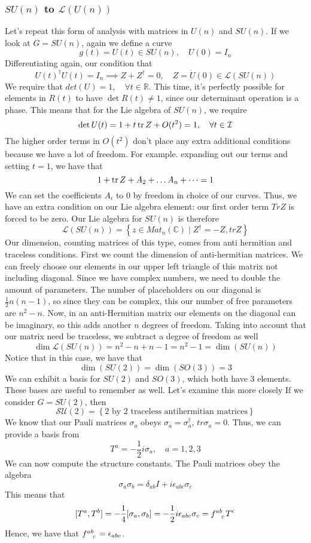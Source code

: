 \documentclass[11pt, oneside]{article}   	%
\theoremstyle{slanted}
\begin{document}
\subsubsection{ $ SU ( n ) $ to $ \mathcal{ L } ( U ( n ) ) $}
Let's repeat this form of analysis with matrices in 
$ U ( n ) $ and $ SU ( n ) $. 
If we look at $ G = SU ( n ) $, 
again we define a curve 
\[
g ( t) = U ( t) \in SU ( n ), \quad U ( 0 ) = I_n  
\] Differentiating again, our condition that 
\[
 U ( t)^\dagger U ( t )  = I_n \implies Z + Z^\dagger = 0, \quad Z = \dot{ U } ( 0 ) \in \mathcal{ L }( SU ( n ) ) 
\] We require that $ det ( U ) = 1 , \quad \forall t \in \mathbb{ R} $. 
This time, it's perfectly possible for elements in 
$ R (t)$ to have  $ \det  R( t) \neq 1 $, since 
our determinant operation is a phase. 
This means that for the Lie algebra of $ SU ( n ) $, 
we require 
\[
 \det U ( t) = 1 + t \tr Z   + O ( t^2)  = 1, \quad  \forall t \in \mathcal{ I  }
\] 
The higher order terms in $ O ( t^2 ) $ don't place 
any extra additional conditions because we have a lot of freedom. For example. 
expanding out our terms and setting $ t = 1 $, we have
that 
 \[
 1 + \tr Z  + A_2 + \dots A_n + \dots = 1
\] We can set the coefficients $ A_i $ to 0 
by freedom in choice of our curves. Thus, 
we have an extra condition on our Lie algebra element:
our first order term $ Tr Z $ is forced to be zero. 
Our Lie algebra for $ SU ( n ) $ is therefore 
\[
 \mathcal{ L }( SU ( n ) ) = \left\{  z \in Mat_n ( \mathbb{ C} ) \mid Z^\dagger  = - Z, tr Z  \right\} 
\] Our dimension, counting matrices of this type, comes from anti hermitian and traceless conditions.
First we count the dimension of 
anti-hermitian matrices. We can freely 
choose our elements in our upper left triangle 
of this matrix not including diagonal. Since we have complex numbers, 
we need to double the amount of parameters. The number 
of placeholders on our diagonal is $\frac{1}{2 } n ( n - 1) $, 
so since they can be complex, this our number of 
free parameters are $ n ^ 2 - n $. Now, in an anti-Hermitian matrix 
our elements on the diagonal can be imaginary, so this adds another 
$ n $ degrees of freedom. Taking into account that our matrix need be traceless, 
we subtract a degree of freedom as well 
\[
 \dim \mathcal{ L } (  SU ( n ) )  =  n ^ 2 - n + n - 1 = n^ 2 - 1 = \dim (  SU ( n ) )   
\] 
Notice that in this case, we have that 
\[
\dim ( SU ( 2) ) = \dim ( SO ( 3) ) = 3 
\] We can exhibit a basis for $ SU ( 2) $ and $ SO ( 3) $, 
which both have 3 elements. These bases are 
useful to remember as well. Let's examine this more closely 
If we consider $ G = SU ( 2) $, 
then  \[
	\mathcal{ SU ( 2) } = \left\{ \text{2 by 2 traceless antihermitian matrices}  \right\} 
\] We know that our Pauli matrices $ \sigma_ a $ obeys $ \sigma_ a = \sigma  _a ^ \dagger$,  $ tr \sigma_ a = 0$. 
Thus, we can provide a basis from 
 \[
 T ^ a = - \frac{1}{2 } i \sigma_ a , \quad a = 1,2, 3 
\] We can now compute the structure constants. The Pauli matrices obey the algebra 
\[
 \sigma_a \sigma_ b = \delta_{ ab } I + i \epsilon_{ abc } \sigma_ c
\] This means that 
\[
	[ T ^ a , T ^ b ] = - \frac{1}{ 4 } [ \sigma_ a , \sigma_ b ] = - \frac{1}{2 } i \epsilon_{ abc } \sigma_ c = f \indices{ ^ { ab } _ c } T ^ c  
\] Hence, we have that $ f \indices{^ { ab } _ c }  = \epsilon_{ abc } $. 
\end{document}
